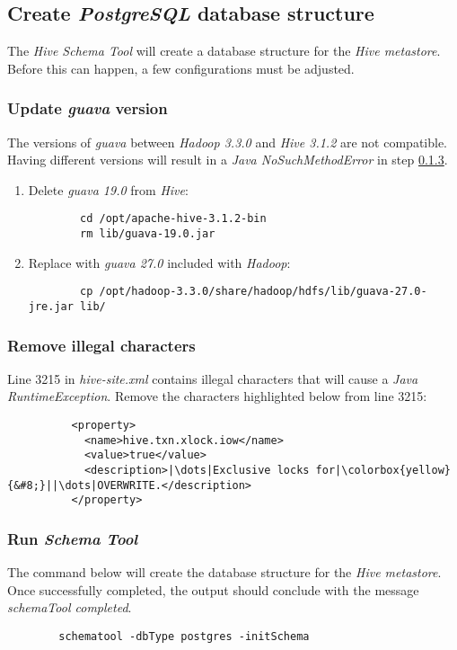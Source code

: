 \documentclass{article}
\begin{document}
    \subsection{Create \emph{PostgreSQL} database structure}
    The \emph{Hive Schema Tool} will create a database structure for the \emph{Hive metastore}.
    Before this can happen, a few configurations must be adjusted.
        
        \subsubsection{Update \emph{guava} version}
        The versions of \emph{guava} between \emph{Hadoop 3.3.0} and \emph{Hive 3.1.2} are not compatible.
        Having different versions will result in a \emph{Java NoSuchMethodError} in step \ref{subsec:schematool}.
        \begin{enumerate}
        \item Delete \emph{guava 19.0} from \emph{Hive}:
        \begin{verbatim}
        cd /opt/apache-hive-3.1.2-bin
        rm lib/guava-19.0.jar
        \end{verbatim}
        
        \item Replace with \emph{guava 27.0} included with \emph{Hadoop}:
        \begin{verbatim}
        cp /opt/hadoop-3.3.0/share/hadoop/hdfs/lib/guava-27.0-jre.jar lib/
        \end{verbatim}
        \end{enumerate}
        
        \subsubsection{Remove illegal characters}
        Line 3215 in \emph{hive-site.xml} contains illegal characters that will cause a
        \emph{Java RuntimeException}. Remove the characters highlighted below from line 3215:
        \begin{verbatim}
          <property>
            <name>hive.txn.xlock.iow</name>
            <value>true</value>
            <description>|\dots|Exclusive locks for|\colorbox{yellow}{&#8;}||\dots|OVERWRITE.</description>
          </property>
        \end{verbatim}
        
        \subsubsection{Run \emph{Schema Tool}}
        \label{subsec:schematool}
        The command below will create the database structure for the \emph{Hive metastore}. Once
        successfully completed, the output should conclude with the message \emph{schemaTool completed}.
        \begin{verbatim}
        schematool -dbType postgres -initSchema
        \end{verbatim}
        
\end{document}
